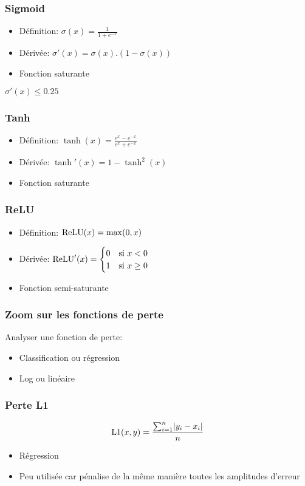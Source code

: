 \documentclass{formation}
\begin{document}
\begin{frame}
  \frametitle{Sigmoid}
  \begin{itemize}
  \item Définition: $\sigma(x) = \frac{1}{1 + e^{-x}}$
  \item Dérivée: $\sigma'(x) = \sigma(x).(1 - \sigma(x))$
  \item Fonction saturante
  \end{itemize}
  \alert{$\sigma'(x) \leq 0.25$}
\end{frame}

\begin{frame}
  \frametitle{Tanh}
  \begin{itemize}
  \item Définition: $\tanh(x) = \frac{e^x - e^{-x}}{e^x + e^{-x}}$
  \item Dérivée: $\tanh'(x) = 1 - \tanh^2(x)$
  \item Fonction saturante
  \end{itemize}
\end{frame}

\begin{frame}
  \frametitle{ReLU}
  \begin{itemize}
  \item Définition: $\ReLU(x) = \max(0, x)$
  \item Dérivée: \(\ReLU'(x) =
    \begin{cases}
      0 & \text{si}\ x < 0\\
      1 & \text{si}\ x \geq 0
    \end{cases}
    \)
  \item Fonction semi-saturante
  \end{itemize}
\end{frame}

\begin{frame}
  \frametitle{Zoom sur les fonctions de perte}
  Analyser une fonction de perte:
  \begin{itemize}
  \item Classification ou régression
  \item Log ou linéaire
  \end{itemize}
\end{frame}

\begin{frame}
  \frametitle{Perte L1}
  \[
    \l1(x, y) = \frac{\sum_{i = 1}^n \lvert y_i - x_i \lvert}{n}
  \]

  \begin{itemize}
  \item Régression
  \item Peu utilisée car pénalise de la même manière toutes les
    amplitudes d'erreur
  \end{itemize}
\end{frame}
\end{document}
